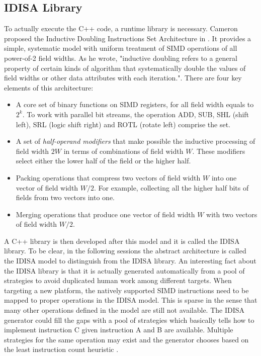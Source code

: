 \subsection{IDISA Library}
To actually execute the C++ code, a runtime library is necessary. Cameron proposed the Inductive Doubling Instructions Set Architecture in \cite{inductive_doubling_principle}. It provides a simple, systematic model with uniform treatment of SIMD operations of all power-of-2 field widths. As he wrote, "inductive doubling refers to a general property of certain kinds of algorithm that systematically double the values of field widths or other data attributes with each iteration."\cite{inductive_doubling_principle}. There are four key elements of this architecture:
\begin{itemize}
    \item A core set of binary functions on SIMD registers, for all field width equals to $2^k$. To work with parallel bit streams, the operation ADD, SUB, SHL (shift left), SRL (logic shift right) and ROTL (rotate left) comprise the set.
    \item A set of \textit{half-operand modifiers} that make possible the inductive processing of field width $2W$ in terms of combinations of field width $W$. These modifiers select either the lower half of the field or the higher half.
    \item Packing operations that compress two vectors of field width $W$ into one vector of field width $W/2$. For example, collecting all the higher half bits of fields from two vectors into one.
    \item Merging operations that produce one vector of field width $W$ with two vectors of field width $W/2$.
\end{itemize}

A C++ library is then developed after this model and it is called the IDISA library. To be clear, in the following sessions the abstract architecture is called the IDISA model to distinguish from the IDISA library. An interesting fact about the IDISA library is that it is actually generated automatically from a pool of strategies to avoid duplicated human work among different targets. When targeting a new platform, the natively supported SIMD instructions need to be mapped to proper operations in the IDISA model. This is sparse in the sense that many other operations defined in the model are still not available. The IDISA generator could fill the gaps with a pool of strategies which basically tells how to implement instruction C given instruction A and B are available. Multiple strategies for the same operation may exist and the generator chooses based on the least instruction count heuristic \cite{hua_idisa}.

